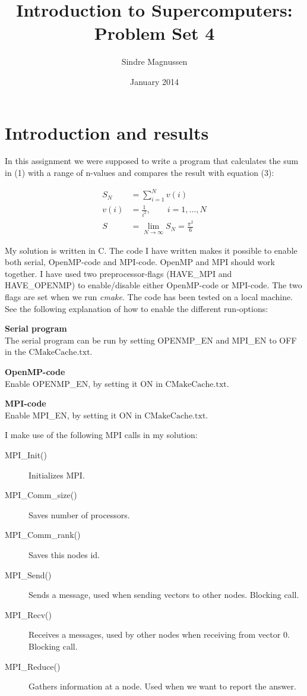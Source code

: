 \documentclass{article}
\title{Introduction to Supercomputers: Problem Set 4}
\author{Sindre Magnussen}
\date{January 2014}
\begin{document}
\maketitle

\section*{Introduction and results}
	In this assignment we were supposed to write a program that calculates the sum in (1) with a range of n-values and compares the result with equation (3):
	
	\begin{align}
	S_N &= \sum_{i = 1}^{N} v(i) \\
	v(i) &= \frac{1}{i^2},\qquad i = 1,\ldots,N \\
	S &= \lim_{N\to\infty} S_N = \frac{\pi^2}{6}
	\end{align}
	
	My solution is written in C. The code I have written makes it possible to enable both serial, OpenMP-code and MPI-code. OpenMP and MPI should work together. I have used two preprocessor-flags (HAVE\_MPI and HAVE\_OPENMP) to enable/disable either OpenMP-code or MPI-code. The two flags are set when we run \emph{cmake}. The code has been tested on a local machine. See the following explanation of how to enable the different run-options: 

\begin{list}{}{}
\item \textbf{Serial program} \\
	The serial program can be run by setting OPENMP\_EN and MPI\_EN to OFF in the $\mathrm{CMakeCache.txt}$.
	
\item \textbf{OpenMP-code} \\
	Enable OPENMP\_EN, by setting it ON in $\mathrm{CMakeCache.txt}$. 
	
\item \textbf{MPI-code} \\
	Enable MPI\_EN, by setting it ON in $\mathrm{CMakeCache.txt}$. 
\end{list}

\newpage

I make use of the following MPI calls in my solution:

\begin{description} 
	\item[MPI\_Init()] Initializes MPI.
	\item[MPI\_Comm\_size()] Saves number of processors.
	\item[MPI\_Comm\_rank()] Saves this nodes id.
	\item[MPI\_Send()] Sends a message, used when sending vectors to other nodes. Blocking call.
	\item[MPI\_Recv()] Receives a messages, used by other nodes when receiving from vector 0. Blocking call.
	\item[MPI\_Reduce()] Gathers information at a node. Used when we want to report the answer.
\end{description}
\end{document}
